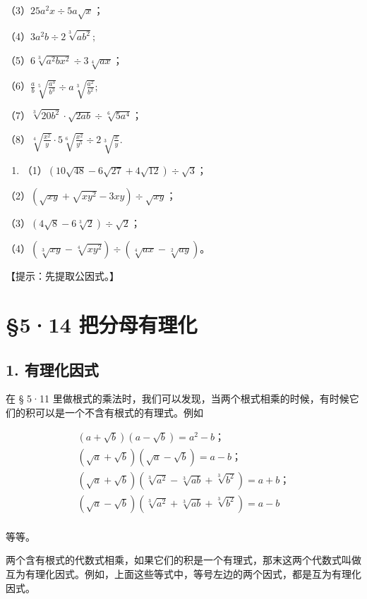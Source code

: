（3）\(25a^{2}x \div 5a\sqrt{x}\)；

（4）\(3a^{2}b \div 2\sqrt[3]{ab^{2}};\)

（5）\(6\sqrt[3]{a^2bx^2} \div 3\sqrt[4]{ax}\)；

（6）\(\frac{a}{b}\sqrt[5]{\frac{a^3}{b^3}}\div a\sqrt[3]{\frac{a^2}{b^2}};\)

（7）\(\sqrt[3]{20b^2} \cdot \sqrt{2ab} \div \sqrt[6]{5a^4}\)；

（8）\(\sqrt[4]{\frac{x^2}{y}} \cdot 5\sqrt[6]{\frac{x^2}{y^5}} \div 2\sqrt[3]{\frac{x}{y}}.\)

\begin{enumerate}[start=4]
\item
  （1）\((10\sqrt{48} - 6\sqrt{27} + 4\sqrt{12}) \div \sqrt{3}\)；
\end{enumerate}

（2）\((\sqrt{xy} + \sqrt{xy^2} - 3xy) \div \sqrt{xy}\)；

（3）\((4\sqrt{8} - 6\sqrt[3]{2}) \div \sqrt{2}\)；

（4）\((\sqrt[3]{xy} - \sqrt[4]{xy^2}) \div (\sqrt[4]{ax} - \sqrt[2]{ay})\)。

【提示：先提取公因式。】

\section{§5·14 把分母有理化}

\subsection{1. 有理化因式}

在 § 5·11
里做根式的乘法时，我们可以发现，当两个根式相乘的时候，有时候它们的积可以是一个不含有根式的有理式。例如

\[
\begin{array}{l} (a + \sqrt {b}) (a - \sqrt {b}) = a ^ {2} - b\text{；} \\ (\sqrt {a} + \sqrt {b}) (\sqrt {a} - \sqrt {b}) = a - b\text{；} \\ (\sqrt {a} + \sqrt {b}) \left(\sqrt[3]{a ^ {2}} - \sqrt[3]{a b} + \sqrt[3]{b ^ {2}}\right) = a + b\text{；} \\ (\sqrt {a} - \sqrt {b}) \left(\sqrt[3]{a ^ {2}} + \sqrt[3]{a b} + \sqrt[3]{b ^ {2}}\right) = a - b \\ \end{array}
\]

等等。

两个含有根式的代数式相乘，如果它们的积是一个有理式，那末这两个代数式叫做互为有理化因式。例如，上面这些等式中，等号左边的两个因式，都是互为有理化因式。

